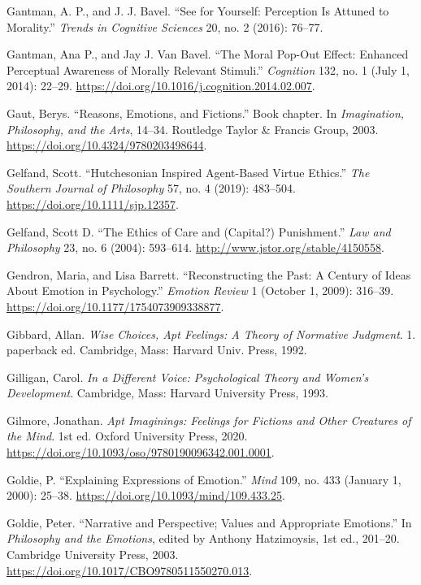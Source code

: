 \documentclass[phdthesis,12pt,final]{wuthesis}
\newlength{\cslhangindent}
\newenvironment{CSLReferences}[2] %
{\begin{list}{}{%
	\setlength{\itemindent}{0pt}
	\setlength{\leftmargin}{0pt}
	\setlength{\parsep}{0pt}
	\ifodd #1
	\setlength{\leftmargin}{\cslhangindent}
	\setlength{\itemindent}{-1\cslhangindent}
	\fi
	\setlength{\itemsep}{#2\baselineskip}}}
{\end{list}}
\theoremstyle{definition}
\theoremstyle{definition}
\theoremstyle{definition}
\theoremstyle{definition}
\theoremstyle{remark}
\begin{document}
\begin{CSLReferences}{1}{0}
Gantman, A. P., and J. J. Bavel. {``See for Yourself: Perception Is Attuned to Morality.''} \emph{Trends in Cognitive Sciences} 20, no. 2 (2016): 76--77.

Gantman, Ana P., and Jay J. Van Bavel. {``The Moral Pop-Out Effect: {Enhanced} Perceptual Awareness of Morally Relevant Stimuli.''} \emph{Cognition} 132, no. 1 (July 1, 2014): 22--29. \url{https://doi.org/10.1016/j.cognition.2014.02.007}.

Gaut, Berys. {``Reasons, Emotions, and Fictions.''} Book chapter. In \emph{Imagination, {Philosophy}, and the {Arts}}, 14--34. Routledge Taylor \& Francis Group, 2003. \url{https://doi.org/10.4324/9780203498644}.

Gelfand, Scott. {``Hutchesonian Inspired Agent-Based Virtue Ethics.''} \emph{The Southern Journal of Philosophy} 57, no. 4 (2019): 483--504. \url{https://doi.org/10.1111/sjp.12357}.

Gelfand, Scott D. {``The {Ethics} of {Care} and ({Capital}?) {Punishment}.''} \emph{Law and Philosophy} 23, no. 6 (2004): 593--614. \url{http://www.jstor.org/stable/4150558}.

Gendron, Maria, and Lisa Barrett. {``Reconstructing the {Past}: {A Century} of {Ideas About Emotion} in {Psychology}.''} \emph{Emotion Review} 1 (October 1, 2009): 316--39. \url{https://doi.org/10.1177/1754073909338877}.

Gibbard, Allan. \emph{Wise Choices, Apt Feelings: A Theory of Normative Judgment}. 1. paperback ed. Cambridge, Mass: Harvard Univ. Press, 1992.

Gilligan, Carol. \emph{In a Different Voice: Psychological Theory and Women's Development}. Cambridge, Mass: Harvard University Press, 1993.

Gilmore, Jonathan. \emph{Apt {Imaginings}: {Feelings} for {Fictions} and {Other Creatures} of the {Mind}}. 1st ed. Oxford University Press, 2020. \url{https://doi.org/10.1093/oso/9780190096342.001.0001}.

Goldie, P. {``Explaining Expressions of Emotion.''} \emph{Mind} 109, no. 433 (January 1, 2000): 25--38. \url{https://doi.org/10.1093/mind/109.433.25}.

Goldie, Peter. {``Narrative and {Perspective}; {Values} and {Appropriate Emotions}.''} In \emph{Philosophy and the {Emotions}}, edited by Anthony Hatzimoysis, 1st ed., 201--20. Cambridge University Press, 2003. \url{https://doi.org/10.1017/CBO9780511550270.013}.


\end{CSLReferences}
\end{document}
